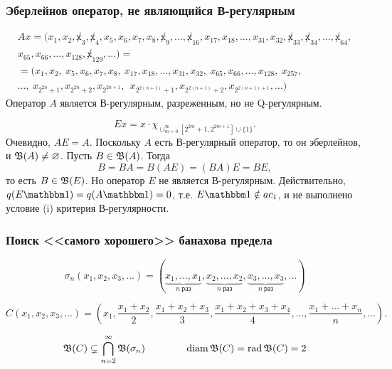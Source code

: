 \begin{frame}\frametitle{{Эберлейнов оператор, не являющийся В-регулярным}}
	\vspace{-3em}
	\begin{multline}
		\label{eq:oper_A_throws_out_2power_blocks}
		Ax = (x_1, x_2, \not x_3, \not x_4, x_5, x_6, x_7, x_8, \not x_9, ..., \not x_{16}, x_{17}, x_{18}, ..., x_{31}, x_{32}, \not x_{33}, \not x_{34}, ..., \not x_{64},
		\\
		x_{65}, x_{66}, ..., x_{128}, \not x_{129}, ...)=
		\\=
		(x_1, x_2, \ x_5, x_6, x_7, x_8, \ x_{17}, x_{18}, ..., x_{31}, x_{32}, \ x_{65}, x_{66}, ..., x_{128}, \ x_{257},
		\\
		..., \ x_{2^{2n} +1}, x_{2^{2n} +2},  x_{2^{2n+1}}, \ \ x_{2^{2(n+1)} +1},  x_{2^{2(n+1)} +2},  x_{2^{2(n+1)+1}}, ...)
	\end{multline}
	Оператор $A$ является В-регулярным, разреженным, но не Q-регулярным.
	\vfill

	\begin{equation}
		Ex = x \cdot \chi_{\cup_{m=0}^{\infty}\left[2^{2 m}+1, 2^{2 m+1}\right] \cup\{1\}}
		.
	\end{equation}
	\vfill
	Очевидно, $AE=A$.
	Поскольку $A$ есть В-регулярный оператор, то он эберлейнов,
	и $\mathfrak{B}(A)\ne\varnothing$.
	Пусть $B\in\mathfrak{B}(A)$. Тогда
	\begin{equation}
		B = BA = B(AE) = (BA)E = BE
		,
	\end{equation}
	то есть $B\in\mathfrak{B}(E)$.
	Но оператор $E$ не является В-регулярным.
	Действительно, $q(E\one) =q(A\one) =0$, т.е. $ E\one \notin ac_1$,
	и не выполнено условие (i) критерия В-регулярности.
	\vfill
\end{frame}


\begin{frame}\frametitle{Поиск <<самого хорошего>> банахова предела}
	\begin{equation}
		\sigma_n (x_1, x_2, x_3, ...) = (
		\underbrace{x_1,...,x_1}_{n~\text{раз}},
		\underbrace{x_2,...,x_2}_{n~\text{раз}},
		\underbrace{x_3,...,x_3}_{n~\text{раз}},
		...)
	\end{equation}

	\begin{equation}
		C (x_1, x_2, x_3, ...) = \left(
		x_1,
		\dfrac{x_1+x_2}2,
		\dfrac{x_1+x_2 + x_3}3,
		\dfrac{x_1+x_2+x_3+x_4}4,
		...,
		\dfrac{x_1+...+x_n}n,
		...\right)
		.
	\end{equation}

	\begin{equation}
		\mathfrak{B}(C) \subsetneq \bigcap_{n=2}^\infty \mathfrak{B}(\sigma_n)
		\qquad
		\qquad
		\operatorname{diam}\mathfrak{B}(C) = \operatorname{rad} \mathfrak{B}(C) = 2
	\end{equation}
\end{frame}


